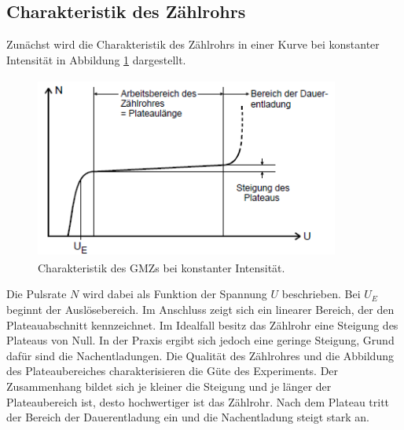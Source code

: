 \subsection{Charakteristik des Zählrohrs}
Zunächst wird die Charakteristik des Zählrohrs in einer Kurve bei konstanter Intensität in Abbildung \ref{fig:Erholungszeit} dargestellt.
\begin{figure}[H]
\begin{center}
\includegraphics[width = 10cm, height= 6cm]{Erholungszeit.png}
\caption{Charakteristik des GMZs bei konstanter Intensität.\protect\cite{AL}}
\label{fig:Erholungszeit}
\end{center}
\end{figure}
\noindent
Die Pulsrate $N$ wird dabei als Funktion der Spannung $U$ beschrieben.
Bei $U_{{E}}$ beginnt der Auslösebereich. Im Anschluss zeigt sich ein linearer Bereich, der den Plateauabschnitt kennzeichnet.
Im Idealfall besitz das Zählrohr eine Steigung des Plateaus von Null.
In der Praxis ergibt sich jedoch eine geringe Steigung, Grund dafür sind die Nachentladungen.
Die Qualität des Zählrohres und die Abbildung des Plateaubereiches charakterisieren die Güte des Experiments.
Der Zusammenhang bildet sich je kleiner die Steigung und je länger der Plateaubereich ist, desto hochwertiger ist das Zählrohr.
Nach dem Plateau tritt der Bereich der Dauerentladung ein und die Nachentladung steigt stark an.
\label{sec:Theorie}


